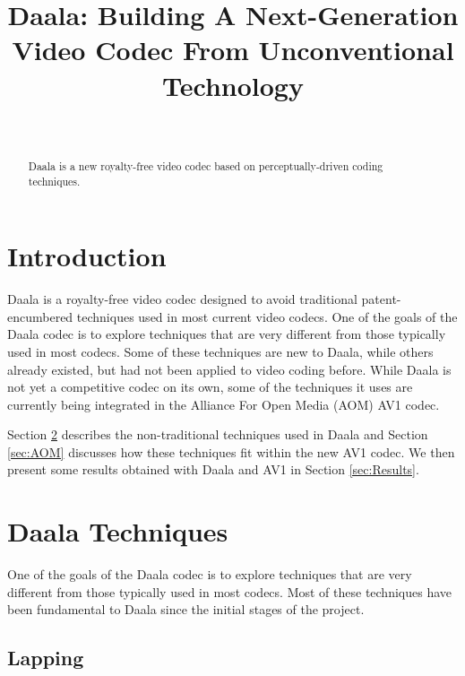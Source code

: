 \documentclass[english,conference,10pt]{IEEEtran}
\begin{document}
\title{Daala: Building A Next-Generation Video Codec From Unconventional
Technology}


\author{\author{
\\
}}
\maketitle
\begin{abstract}
Daala is a new royalty-free video codec based on perceptually-driven
coding techniques.
\end{abstract}


\section{Introduction}

Daala is a royalty-free video codec designed to avoid traditional
patent-encumbered techniques used in most current video codecs. One
of the goals of the Daala codec is to explore techniques that are
very different from those typically used in most codecs. Some of
these techniques are new to Daala, while others already existed, but
had not been applied to video coding before. While Daala is not yet
a competitive codec on its own, some of the techniques it uses are
currently being integrated in the Alliance For Open Media (AOM) AV1 codec.

Section \ref{sec:techniques} describes the non-traditional techniques used
in Daala and Section \ref{sec:AOM} discusses how these techniques fit within
the new AV1 codec. We then present some results obtained with Daala and AV1
in Section \ref{sec:Results}.

\section{Daala Techniques}
\label{sec:techniques}

One of the goals of the Daala codec is to explore techniques that
are very different from those typically used in most codecs. Most
of these techniques have been fundamental to Daala since the initial
stages of the project. 


\subsection{Lapping}
\end{document}
